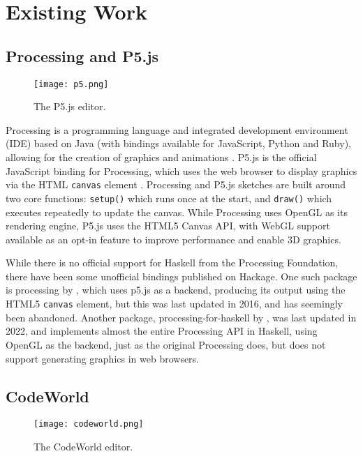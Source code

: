 \documentclass[../main.tex]{subfiles}
\begin{document}
    \section{Existing Work}
        \subsection{Processing and P5.js}
            \begin{figure}[H]
                \centering
                \texttt{[image: p5.png]}
                    \caption{The P5.js editor.}
                    \label{fig:p5}
            \end{figure}

            Processing is a programming language and integrated development environment
                (IDE) based on Java (with bindings available for JavaScript, Python and Ruby),
                allowing for the creation of graphics and animations \citep{processing}.
            P5.js is the official JavaScript binding for Processing, which uses the web
                browser to display graphics via the HTML \texttt{canvas} element \citep{p5js}.
            Processing and P5.js sketches are built around two core functions:
                \texttt{setup()} which runs once at the start, and \texttt{draw()} which
                executes repeatedly to update the canvas.
            While Processing uses OpenGL as its rendering engine, P5.js uses the HTML5
                Canvas API, with WebGL support available as an opt-in feature \citep{p5WebGL}
                to improve performance and enable 3D graphics.

            While there is no official support for Haskell from the Processing Foundation,
                there have been some unofficial bindings published on Hackage.
            One such package is processing by \citet{hackageProcessing}, which uses p5.js
                as a backend, producing its output using the HTML5 \texttt{canvas} element, but
                this was last updated in 2016, and has seemingly been abandoned.
            Another package, processing-for-haskell by \citet{hackageProcessingForHaskell},
                was last updated in 2022, and implements almost the entire Processing API in
                Haskell, using OpenGL as the backend, just as the original Processing does, but
                does not support generating graphics in web browsers.

        \subsection{CodeWorld}
            \begin{figure}[H]
                \centering
                \texttt{[image: codeworld.png]}
                    \caption{The CodeWorld editor.}
                    \label{fig:codeworld}
            \end{figure}
\end{document}

